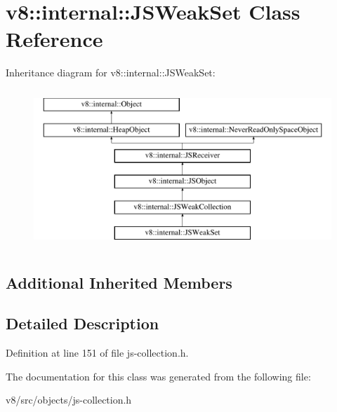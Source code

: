 \hypertarget{classv8_1_1internal_1_1JSWeakSet}{}\section{v8\+:\+:internal\+:\+:J\+S\+Weak\+Set Class Reference}
\label{classv8_1_1internal_1_1JSWeakSet}
Inheritance diagram for v8\+:\+:internal\+:\+:J\+S\+Weak\+Set\+:\begin{figure}[H]
\begin{center}
\leavevmode
\includegraphics[height=6.000000cm]{classv8_1_1internal_1_1JSWeakSet}
\end{center}
\end{figure}
\subsection*{Additional Inherited Members}


\subsection{Detailed Description}


Definition at line 151 of file js-\/collection.\+h.



The documentation for this class was generated from the following file\+:\begin{DoxyCompactItemize}
\item 
v8/src/objects/js-\/collection.\+h\end{DoxyCompactItemize}
